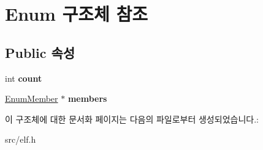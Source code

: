 \hypertarget{struct_enum}{}\section{Enum 구조체 참조}
\label{struct_enum}
\subsection*{Public 속성}
\begin{DoxyCompactItemize}
\item 
\mbox{\label{struct_enum_abe9638dad7a7d68bde2843b2b80c8659}} 
int {\bfseries count}
\item 
\mbox{\label{struct_enum_ab6bd4304bb7b4f66498268417ca1ef00}} 
\mbox{\hyperlink{struct_enum_member}{Enum\+Member}} $\ast$ {\bfseries members}
\end{DoxyCompactItemize}


이 구조체에 대한 문서화 페이지는 다음의 파일로부터 생성되었습니다.\+:\begin{DoxyCompactItemize}
\item 
src/elf.\+h\end{DoxyCompactItemize}
